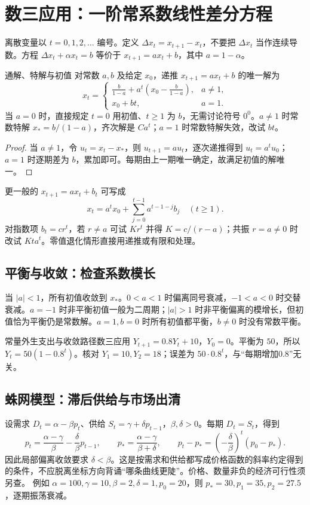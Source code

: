 \section{数三应用：一阶常系数线性差分方程}\label{r2:difference}
离散变量以 $t=0,1,2,\ldots$ 编号。定义 $\Delta x_t=x_{t+1}-x_t$，不要把 $\Delta x_t$ 当作连续导数。方程 $\Delta x_t+\alpha x_t=b$ 等价于 $x_{t+1}=a x_t+b$，其中 $a=1-\alpha$。

\begin{theorem}{通解、特解与初值}
对常数 $a,b$ 及给定 $x_0$，递推 $x_{t+1}=a x_t+b$ 的唯一解为
\[
 x_t=\begin{cases}
 \displaystyle\frac{b}{1-a}+a^t\left(x_0-\frac{b}{1-a}\right),&a\ne1,\\[4pt]
 x_0+bt,&a=1.
 \end{cases}
\]
当 $a=0$ 时，直接规定 $t=0$ 用初值、$t\ge1$ 为 $b$，无需讨论符号 $0^0$。$a\ne1$ 时常数特解 $x_*=b/(1-a)$，齐次解是 $Ca^t$；$a=1$ 时常数特解失效，改试 $bt$。
\end{theorem}
\begin{proof}
当 $a\ne1$，令 $u_t=x_t-x_*$，则 $u_{t+1}=au_t$，逐次递推得到 $u_t=a^tu_0$；$a=1$ 时逐期差为 $b$，累加即可。每期由上一期唯一确定，故满足初值的解唯一。
\end{proof}
更一般的 $x_{t+1}=a x_t+b_t$ 可写成
\[
 x_t=a^t x_0+\sum_{j=0}^{t-1}a^{t-1-j}b_j\quad(t\ge1).
\]
对指数项 $b_t=c r^t$，若 $r\ne a$ 可试 $K r^t$ 并得 $K=c/(r-a)$；共振 $r=a\ne0$ 时改试 $Kt a^t$。零值退化情形直接用递推或有限和处理。

\subsection{平衡与收敛：检查系数模长}
当 $|a|<1$，所有初值收敛到 $x_*$。$0<a<1$ 时偏离同号衰减，$-1<a<0$ 时交替衰减。$a=-1$ 时非平衡初值一般为二周期；$|a|>1$ 时非平衡偏离的模增长，但初值恰为平衡仍是常数解。$a=1,b=0$ 时所有初值都平衡，$b\ne0$ 时没有常数平衡。

\begin{example}{常量外生支出与收敛路径}{数三应用}
$Y_{t+1}=0.8Y_t+10$，$Y_0=0$。平衡为 $50$，所以 $Y_t=50(1-0.8^t)$。核对 $Y_1=10,Y_2=18$；误差为 $50\cdot0.8^t$，与“每期增加0.8”无关。
\end{example}

\subsection{蛛网模型：滞后供给与市场出清}
设需求 $D_t=\alpha-\beta p_t$、供给 $S_t=\gamma+\delta p_{t-1}$，$\beta,\delta>0$。每期 $D_t=S_t$，得到
\[
 p_t=\frac{\alpha-\gamma}{\beta}-\frac{\delta}{\beta}p_{t-1},\qquad
 p_* =\frac{\alpha-\gamma}{\beta+\delta},\qquad
 p_t-p_* =\left(-\frac{\delta}{\beta}\right)^t(p_0-p_*).
\]
因此局部偏离收敛要求 $\delta<\beta$。这是按需求和供给都写成价格函数的斜率约定得到的条件，不应脱离坐标方向背诵“哪条曲线更陡”。价格、数量非负的经济可行性须另查。
例如 $\alpha=100,\gamma=10,\beta=2,\delta=1,p_0=20$，则 $p_*=30,p_1=35,p_2=27.5$，逐期振荡衰减。

